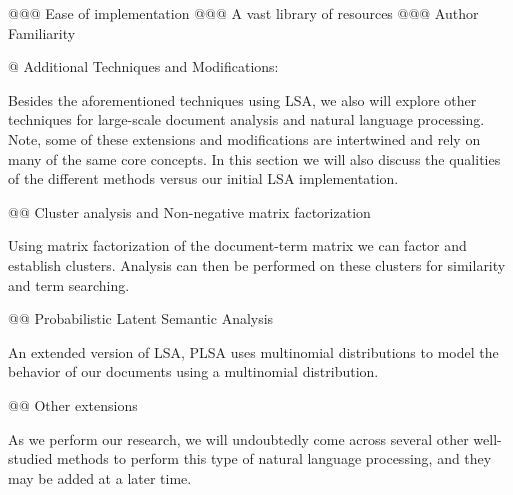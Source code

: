 \documentclass[10pt]{article}
\begin{document}
\begin{easylist}[enumerate]
    @@@ Ease of implementation
    @@@ A vast library of resources
    @@@ Author Familiarity

    @ Additional Techniques and Modifications:

    Besides the aforementioned techniques using LSA, we also will explore other
    techniques for large-scale document analysis and natural language
    processing. Note, some of these extensions and modifications are intertwined
    and rely on many of the same core concepts. In this section we will also
    discuss the qualities of the different methods versus our initial LSA
    implementation.

    @@ Cluster analysis and Non-negative matrix factorization

    Using matrix factorization of the document-term matrix we can factor and
    establish clusters. Analysis can then be performed on these clusters for
    similarity and term searching.

    @@ Probabilistic Latent Semantic Analysis

    An extended version of LSA, PLSA uses multinomial distributions to model the
    behavior of our documents using a multinomial distribution.

    @@ Other extensions

    As we perform our research, we will undoubtedly come across several other
    well-studied methods to perform this type of natural language processing,
    and they may be added at a later time.
\end{easylist}
\end{document}
